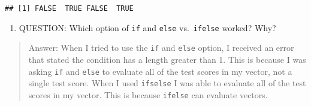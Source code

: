 \documentclass[
]{article}
\providecommand{\tightlist}{%
  \setlength{\itemsep}{0pt}\setlength{\parskip}{0pt}}
\begin{document}
\begin{verbatim}
## [1] FALSE  TRUE FALSE  TRUE
\end{verbatim}

\begin{enumerate}
\def\labelenumi{\arabic{enumi}.}
\setcounter{enumi}{11}
\tightlist
\item
  QUESTION: Which option of \texttt{if} and \texttt{else}
  vs.~\texttt{ifelse} worked? Why?
\end{enumerate}

\begin{quote}
Answer: When I tried to use the \texttt{if} and \texttt{else} option, I
received an error that stated the condition has a length greater than 1.
This is because I was asking \texttt{if} and \texttt{else} to evaluate
all of the test scores in my vector, not a single test score. When I
used \texttt{ifselse} I was able to evaluate all of the test scores in
my vector. This is because \texttt{ifelse} can evaluate vectors.
\end{quote}
\end{document}
